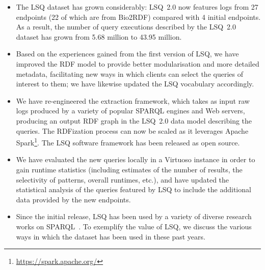 \begin{itemize}
\item The LSQ dataset has grown considerably: LSQ~2.0 now features logs from 27 endpoints (22 of which are from Bio2RDF)
compared with 4 initial endpoints. As a result, the number of query executions described by the LSQ~2.0 dataset has grown from 5.68 million to 43.95 million. 
\item Based on the experiences gained from the first version of LSQ, we have improved the RDF model to provide better modularisation and more detailed metadata, facilitating new ways in which clients can select the queries of interest to them; we have likewise updated the LSQ vocabulary accordingly.
\item We have re-engineered the extraction framework, which takes as input raw logs produced by a variety of popular SPARQL engines and Web servers, producing an output RDF graph in the LSQ~2.0 data model describing the queries. The RDFization process can now be scaled as it leverages Apache Spark\footnote{\url{https://spark.apache.org/}}. The LSQ software framework has been released as open source.
\item We have evaluated the new queries locally in a Virtuoso instance in order to gain runtime statistics (including estimates of the number of results, the selectivity of patterns, overall runtimes, etc.), and have updated the statistical analysis of the queries featured by LSQ to include the additional data provided by the new endpoints.
\item Since the initial release, LSQ has been used by a variety of diverse research works on SPARQL~\cite{SaleemMN15,arenas2016reverse,benedetti2016model,georgala2016efficient,fernandez2019evaluating,georgala2016efficient,han2016statistical,hernandez2016querying,knuth2016scheduling,rico2016data,schoenfisch2016analyzing,song2016efficient,BonifatiMT17,dellal2017addressing,FokouJHB17,FokouJHB17,FokouJHB17,akhtar2018change,bonifati2018darql,dellal2017addressing,FokouJHB17,stegemann2017investigating,thakkar2017trying,akhtar2018change,bonifati2018darql,bonifati2018darql,MartensT18,SalasH18,saleem2018largerdfbench,SaleemMSLN18,varga2018analytical,Viswanathan18,akhtar2019dynamic,cheng2019opt+,fafalios2019many,Potoniec19,SaleemSCBMN19,thost2019qed,wang2019answering,safavi2019personalized,singh2019qaldgen,singh2019qaldgen,azzam2020smart,bigerl2020tentris,zhang2020revealing,AzzamAMKPH21,9364498,9364380,davoudian2021workload,wang2021explaining}. To exemplify the value of LSQ, we discuss the various ways in which the dataset has been used in these past years.
\end{itemize}

